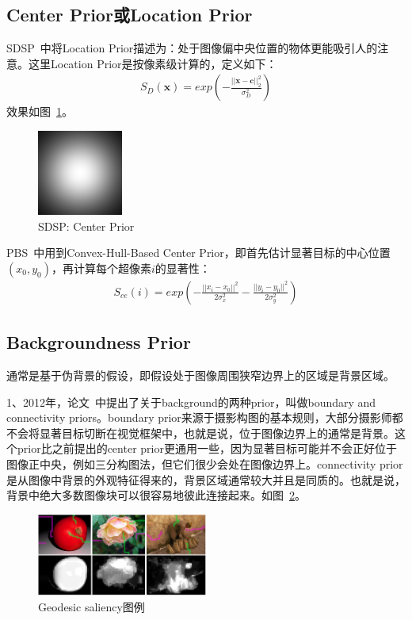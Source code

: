 \documentclass[12pt]{article}
\begin{document}
\subsection{Center Prior或Location Prior}

SDSP~\cite{zhang2013sdsp}中将Location Prior描述为：处于图像偏中央位置的物体更能吸引人的注意。这里Location Prior是按像素级计算的，定义如下：
\begin{align}
S_D(\textbf{x}) = exp\left(-\frac{||\textbf{x}-\textbf{c}||_2^2}{\sigma_D^2}\right)
\end{align}
效果如图~\ref{fig: SDSPCenterPrior}。
\begin{figure}[!ht]
\centering
\includegraphics[width=0.25\textwidth]{SDSPCenterPrior.png}
\caption{SDSP: Center Prior}
\label{fig: SDSPCenterPrior}
\end{figure} 

PBS~\cite{yang2013graph}中用到Convex-Hull-Based Center Prior，即首先估计显著目标的中心位置$(x_0, y_0)$，再计算每个超像素$i$的显著性：
\begin{align}
S_{ce}(i) = exp\left(-\frac{||x_i-x_0||^2}{2\sigma_x^2}-\frac{||y_i-y_0||^2}{2\sigma_y^2}\right)
\end{align}

\subsection{Backgroundness Prior}

通常是基于伪背景的假设，即假设处于图像周围狭窄边界上的区域是背景区域。

1、2012年，论文~\cite{wei2012geodesic}中提出了关于background的两种prior，叫做boundary and connectivity priors。boundary prior来源于摄影构图的基本规则，大部分摄影师都不会将显著目标切断在视觉框架中，也就是说，位于图像边界上的通常是背景。这个prior比之前提出的center prior更通用一些，因为显著目标可能并不会正好位于图像正中央，例如三分构图法，但它们很少会处在图像边界上。connectivity prior是从图像中背景的外观特征得来的，背景区域通常较大并且是同质的。也就是说，背景中绝大多数图像块可以很容易地彼此连接起来。如图~\ref{fig: GS}。
\begin{figure}[!ht]
\centering
\includegraphics[width=0.5\textwidth]{GS.png}
\caption{Geodesic saliency图例}
\label{fig: GS}
\end{figure} 
\end{document}
